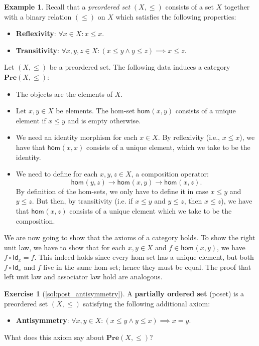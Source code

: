 \documentclass[a4paper,10pt]{scrartcl}
\theoremstyle{plain}
\theoremstyle{definition}
\newtheorem{exa}[thm]{Example}
\newtheorem{exer}[thm]{Exercise}
\newcommand{\cfont}[1]{\ensuremath{\mathsf{#1}}}
\newcommand{\Catb}[1]{\mathbf{#1}}
\newcommand{\PRE}{\Catb{Pre}}
\newcommand{\Hom}[3][]{\cfont{hom}_{#1}(#2,#3)}
\newcommand{\Id}[1][]{\cfont{Id}_{#1}}
\newcommand{\co}[2]{\ensuremath{#2 \circ #1}}
\begin{document}
\begin{exa}\label{example:posetcategories}
Recall that a \textit{preordered set} $(X,\leq)$ consists of a set $X$ together with a binary relation $(\leq)$ on $X$ which satisfies the following properties:
\begin{itemize}
\item \textbf{Reflexivity}: $\forall x\in X: x\leq x$.
\item \textbf{Transitivity}: $\forall x,y,z\in X: \left(x\leq y \wedge y\leq z\right) \implies x\leq z$.
\end{itemize}

  Let $(X,\leq)$ be a preordered set. The following data induces a category $\PRE(X,\leq)$:
\begin{itemize}
\item The objects are the elements of $X$.
\item Let $x,y \in X$ be elements. The hom-set $\Hom x y$ consists of a unique element if $x\leq y$ and is empty otherwise.
\item  We need an identity morphism for each $x\in X$.
  By reflexivity (i.e., $x\leq x$), we have that $\Hom x x$ consists of a unique element, which we take to be the identity.
\item We need to define for each $x,y,z\in X$, a composition operator:
\[
\Hom y z \to \Hom x y \to \Hom x z.
\]
By definition of the hom-sets, we only have to define it in case $x\leq y$ and $y\leq z$.
But then, by transitivity (i.e. if $x\leq y$ and $y\leq z$, then $x\leq z$), we have that $\Hom x z$ consists of a unique element which we take to be the composition.
\end{itemize}
%
We are now going to show that the axioms of a category holds.
To show the right unit law, we have to show that for each $x,y\in X$ and $f\in \Hom x y$, we have $\co{\Id[x]}{f} = f$.
This indeed holds since every hom-set has a unique element, but both $\co{\Id[x]}{f}$ and $f$ live in the same hom-set; hence they must be equal.
The proof that left unit law and associator law hold are analogous.
\end{exa}

\begin{exer}[\cref{sol:post_antisymmetry}]\label{exer:post_antisymmetry}
  A \textbf{partially ordered set} (poset) is a preordered set $(X,\leq)$ satisfying the following additional axiom:
  \begin{itemize}
  \item \textbf{Antisymmetry}: $\forall x,y\in X: (x\leq y \wedge y\leq x) \implies x=y$.
  \end{itemize}
  What does this axiom say about $\PRE(X,\leq)$?
\end{exer}
\end{document}
